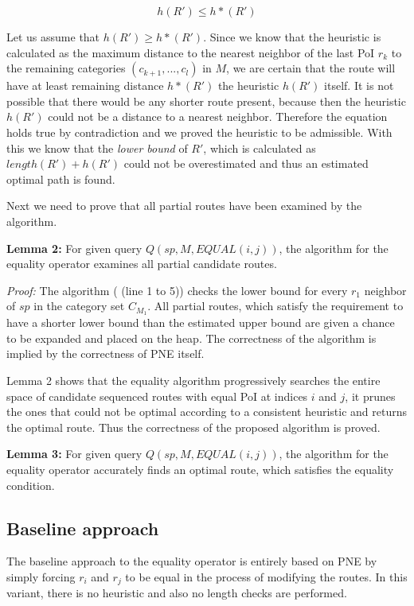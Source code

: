 \begin{equation}
h(R') \leq h*(R')
\end{equation} 

Let us assume that $h(R') \geq h*(R')$. Since we know that the heuristic is calculated as the maximum distance to the nearest neighbor of the last PoI $r_k$ to the remaining categories $(c_{k+1}, ..., c_l)$ in $M$, we are certain that the route will have at least remaining distance $h*(R')$ the heuristic $h(R')$ itself. It is not possible that there would be any shorter route present, because then the heuristic $h(R')$ could not be a distance to a nearest neighbor. Therefore the equation holds true by contradiction and we proved the heuristic to be admissible. With this we know that the \textit{lower bound} of $R'$, which is calculated as $length(R') + h(R')$ could not be overestimated and thus an estimated optimal path is found.

Next we need to prove that all partial routes have been examined by the algorithm.

\textbf{Lemma 2:} For given query $Q(sp, M, EQUAL(i, j))$, the algorithm for the equality operator examines all partial candidate routes.

\textit{Proof:} The algorithm (\texttt{} (line 1 to 5)) checks the lower bound for every $r_1$ neighbor of $sp$ in the category set $C_{M_1}$. All partial routes, which satisfy the requirement to have a shorter lower bound than the estimated upper bound are given a chance to be expanded and placed on the heap. 
The correctness of the algorithm is implied by the correctness of PNE itself.

Lemma 2 shows that the equality algorithm progressively searches the entire space of candidate sequenced routes with equal PoI at indices $i$ and $j$, it prunes the ones that could not be optimal according to a consistent heuristic and returns the optimal route. Thus the correctness of the proposed algorithm is proved.

\textbf{Lemma 3:} For given query $Q(sp, M, EQUAL(i, j))$, the algorithm for the equality operator accurately finds an optimal route, which satisfies the equality condition.

\subsection{Baseline approach} 
\label{sec:baselineEO}
The baseline approach to the equality operator is entirely based on PNE by simply forcing $r_i$ and $r_j$ to be equal in the process of modifying the routes. In this variant, there is no heuristic and also no length checks are performed.

